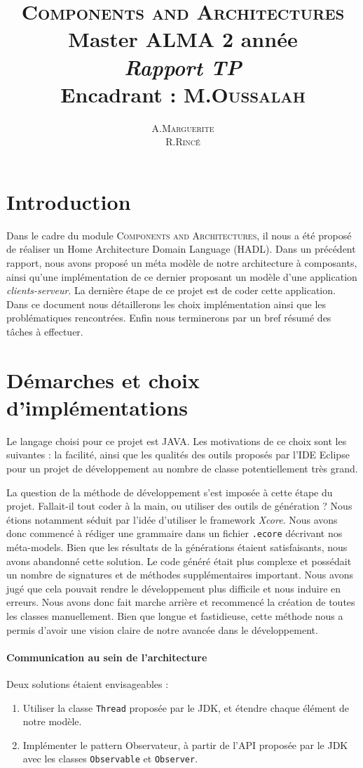 \documentclass[11pt]{article}
\title{ {\huge \textsc{Components and Architectures}} \\  Master ALMA 2\up{eme} année  \\ \emph{Rapport TP}\\{\small Encadrant :  M.\textsc{Oussalah}}}
\author{A.\textsc{Marguerite} \\ R.\textsc{Rincé}}
\begin{document}
\maketitle
\renewcommand{\labelitemi}{$\bullet$} 



\section{Introduction}\label{sec:intro}
Dans le cadre du module \textsc{Components and Architectures}, il nous a été proposé de réaliser un Home Architecture Domain Language (HADL). Dans un précédent rapport, nous avons proposé un méta modèle de notre architecture à composants, ainsi qu'une implémentation de ce dernier proposant un modèle d'une application \textit{clients-serveur}. La dernière étape de ce projet est de coder cette application. Dans ce document nous détaillerons les choix implémentation ainsi que les problématiques rencontrées. Enfin nous terminerons par un bref résumé des tâches à effectuer.
\section{Démarches et choix d'implémentations}\label{sec:pblm}
Le langage choisi pour ce projet est JAVA. Les motivations de ce choix sont les suivantes : la facilité, ainsi que les qualités des outils proposés par l'IDE Eclipse pour un projet de développement au nombre de classe potentiellement très grand. 

La question de la méthode de développement s'est imposée à cette étape du projet. Fallait-il tout coder à la main, ou utiliser des outils de génération ? Nous étions notamment séduit par l'idée d'utiliser le framework \emph{Xcore}. Nous avons donc commencé à rédiger une grammaire dans un fichier \verb+.ecore+ décrivant nos méta-models. Bien que les résultats de la générations étaient satisfaisants, nous avons abandonné cette solution. Le code généré était plus complexe et possédait un nombre de signatures et de méthodes supplémentaires important. Nous avons jugé que cela pouvait rendre le développement plus difficile et nous induire en erreurs. Nous avons donc fait marche arrière et recommencé la création de toutes les classes manuellement. Bien que longue et fastidieuse, cette méthode nous a permis d'avoir une vision claire de notre avancée dans le développement.

\paragraph{Communication au sein de l'architecture}
Deux solutions étaient envisageables :
\begin{enumerate}
\item
  Utiliser la classe \verb+Thread+ proposée par le JDK, et étendre chaque élément de notre modèle. 
\item
  Implémenter le pattern Observateur, à partir de l'API proposée par le JDK avec les classes \verb+Observable+ et \verb+Observer+.
\end{enumerate} 
\end{document}
